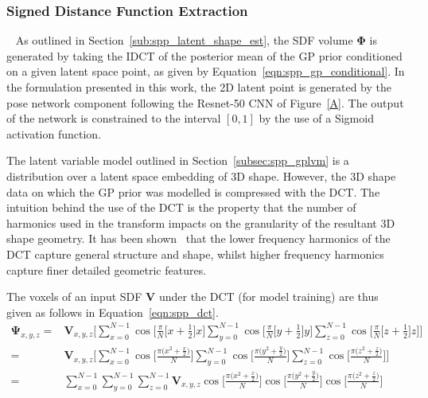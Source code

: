 \subsubsection{Signed Distance Function Extraction}
~\label{subsubsec:sdf_extraction}
As outlined in Section~\ref{sub:spp_latent_shape_est}, the SDF volume \( \bm{\Phi} \) 
is generated by taking the IDCT of the posterior mean of the GP prior conditioned on 
a given latent space point, as given by Equation~\ref{eqn:spp_gp_conditional}. In the 
formulation presented in this work, the 2D latent point is generated by the pose 
network component following the Resnet-50 CNN of Figure~\ref{A}. The output of the network 
is constrained to the interval \( [0, 1] \) by the use of a Sigmoid activation function.

The latent variable model outlined in Section~\ref{subsec:spp_gplvm} is a distribution 
over a latent space embedding of 3D shape. However, the 3D shape data on which the GP 
prior was modelled is compressed with the DCT\@. The intuition behind the use of the DCT 
is the property that the number of harmonics used in the transform impacts on the 
granularity of the resultant 3D shape geometry. It has been shown~\cite{Ren2014} that the 
lower frequency harmonics of the DCT capture general structure and shape, whilst higher 
frequency harmonics capture finer detailed geometric features.

The voxels of an input SDF \( \bm{V} \) under the DCT (for model training) are thus given 
as follows in Equation~\ref{eqn:spp_dct}.
\begin{align}
  \label{eqn:spp_dct}
  \bm{\Psi}_{x, y, z} ={}& \bm{V}_{x, y, z} \Bigg[
  \sum_{x=0}^{N-1} \cos \Big[ \frac{\pi}{N} \big[ x + \frac{1}{2} \big] x \Big]
  \sum_{y=0}^{N-1} \cos \Big[ \frac{\pi}{N} \big[ y + \frac{1}{2} \big] y \Big]
  \sum_{z=0}^{N-1} \cos \Big[ \frac{\pi}{N} \big[ z + \frac{1}{2} \big] z \Big] \Bigg]\\
  ={}& \bm{V}_{x, y, z} \Bigg[
  \sum_{x=0}^{N-1} \cos \Big[ \frac{\pi \big( x^{2} + \frac{x}{2} \big)}{N} \Big]
  \sum_{y=0}^{N-1} \cos \Big[ \frac{\pi \big( y^{2} + \frac{y}{2} \big)}{N} \Big]
  \sum_{z=0}^{N-1} \cos \Big[ \frac{\pi \big( z^{2} + \frac{z}{2} \big)}{N} \Big] \Bigg]\\
  ={}& \sum_{x=0}^{N-1} \sum_{y=0}^{N-1} \sum_{z=0}^{N-1} \bm{V}_{x, y, z}
  \cos \Big[ \frac{\pi \big( x^{2} + \frac{x}{2} \big)}{N} \Big]
  \cos \Big[ \frac{\pi \big( y^{2} + \frac{y}{2} \big)}{N} \Big]
  \cos \Big[ \frac{\pi \big( z^{2} + \frac{z}{2} \big)}{N} \Big]
\end{align}

